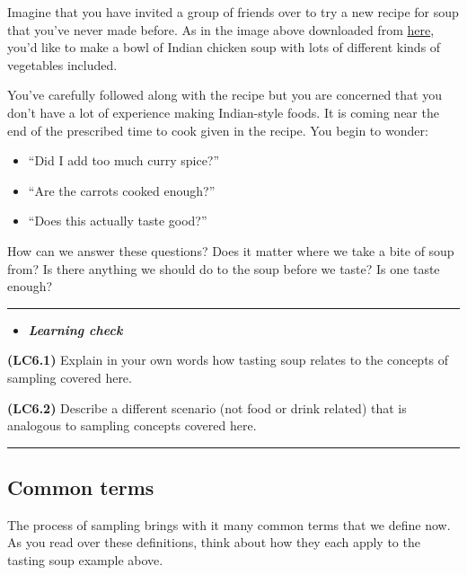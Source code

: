 \documentclass[]{tufte-book}
\let\oldrule=\rule
\renewcommand{\rule}[1]{\oldrule{\linewidth}}
\providecommand{\tightlist}{%
  \setlength{\itemsep}{0pt}\setlength{\parskip}{0pt}}
\newenvironment{rmdblock}[1]
  {\begin{shaded*}
  \begin{itemize}
  \renewcommand{\labelitemi}{
    \raisebox{-.7\height}[0pt][0pt]{
    }
  }
  \item
  }
  {
  \end{itemize}
  \end{shaded*}
  }
\newenvironment{learncheck}
  {\begin{rmdblock}{warning}}
  {\end{rmdblock}}
\begin{document}
Imagine that you have invited a group of friends over to try a new
recipe for soup that you've never made before. As in the image above
downloaded from
\href{http://readthespirit.wpengine.netdna-cdn.com/feed-the-spirit/wp-content/uploads/sites/19/2015/02/Chicken-soup-Indian-by-Fifth-Floor-Kitchen.jpg}{here},
you'd like to make a bowl of Indian chicken soup with lots of different
kinds of vegetables included.

You've carefully followed along with the recipe but you are concerned
that you don't have a lot of experience making Indian-style foods. It is
coming near the end of the prescribed time to cook given in the recipe.
You begin to wonder:

\begin{itemize}
\tightlist
\item
  ``Did I add too much curry spice?''
\item
  ``Are the carrots cooked enough?''\\
\item
  ``Does this actually taste good?''
\end{itemize}

How can we answer these questions? Does it matter where we take a bite
of soup from? Is there anything we should do to the soup before we
taste? Is one taste enough?

\begin{center}\rule{0.5\linewidth}{\linethickness}\end{center}

\begin{learncheck}
\textbf{\emph{Learning check}}
\end{learncheck}

\textbf{(LC6.1)} Explain in your own words how tasting soup relates to
the concepts of sampling covered here.

\textbf{(LC6.2)} Describe a different scenario (not food or drink
related) that is analogous to sampling concepts covered here.

\begin{center}\rule{0.5\linewidth}{\linethickness}\end{center}

\subsection{Common terms}\label{common-terms}

The process of sampling brings with it many common terms that we define
now. As you read over these definitions, think about how they each apply
to the tasting soup example above.
\end{document}
